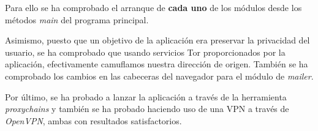 Para ello se ha comprobado el arranque de \textbf{cada uno} de los módulos desde los métodos \textit{main} del programa principal.

Asimismo, puesto que un objetivo de la aplicación era preservar la privacidad del usuario, se ha comprobado que usando servicios Tor proporcionados por la aplicación, efectivamente camuflamos nuestra dirección de origen. También se ha comprobado los cambios en las cabeceras del navegador para el módulo de \textit{mailer}.

Por último, se ha probado a lanzar la aplicación a través de la herramienta \textit{proxychains} y también se ha probado haciendo uso de una VPN a través de \textit{OpenVPN}, ambas con resultados satisfactorios.

